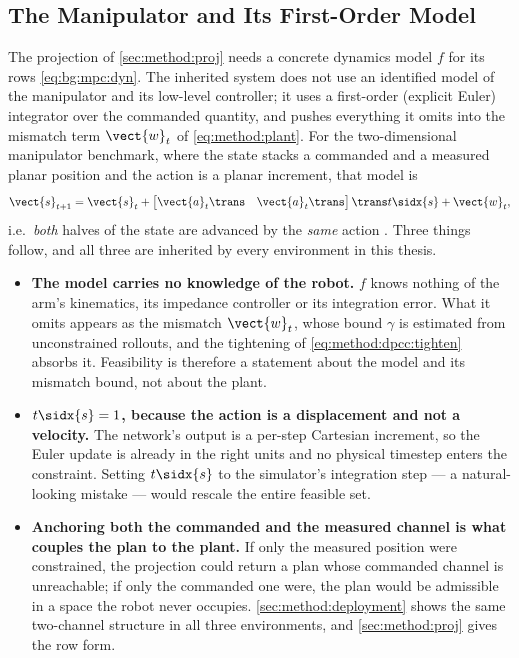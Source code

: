 \subsection{The Manipulator and Its First-Order Model}\label{sec:method:manipulator}

The projection of \autoref{sec:method:proj} needs a concrete dynamics model $f$ for its rows
\eqref{eq:bg:mpc:dyn}. The inherited system does not use an identified
model of the manipulator and its low-level controller; it uses a first-order (explicit Euler)
integrator over the commanded quantity, and pushes everything it omits into the mismatch term
$\vect{w}_{t}$ of \eqref{eq:method:plant}. For the two-dimensional manipulator benchmark, where the
state stacks a commanded and a measured planar position and the action is a planar increment, that
model is
\begin{equation}\label{eq:method:dpcc:euler}
  \vect{s}_{t+1}
  = \vect{s}_{t} + \begin{bmatrix}\vect{a}_{t}\trans & \vect{a}_{t}\trans\end{bmatrix}\trans t\sidx{s}
    + \vect{w}_{t},
\end{equation}
i.e.\ \emph{both} halves of the state are advanced by the \emph{same} action
\parencite[Sec.~6.1]{romer2025diffusion}. Three things follow, and all three are inherited by every
environment in this thesis.

\begin{itemize}
  \item \textbf{The model carries no knowledge of the robot.} $f$ knows nothing of the arm's
    kinematics, its impedance controller or its integration error. What it omits appears as the
    mismatch $\vect{w}_{t}$, whose bound $\gamma$ is estimated from unconstrained rollouts, and the
    tightening of \eqref{eq:method:dpcc:tighten} absorbs it. Feasibility is therefore a statement
    about the model and its mismatch bound, not about the plant.
  \item \textbf{$t\sidx{s} = 1$, because the action is a displacement and not a velocity.} The
    network's output is a per-step Cartesian increment, so the Euler update is already in the right
    units and no physical timestep enters the constraint. Setting $t\sidx{s}$ to the simulator's
    integration step --- a natural-looking mistake --- would rescale the entire feasible set.
  \item \textbf{Anchoring both the commanded and the measured channel is what couples the plan to
    the plant.} If only the measured position were constrained, the projection could return a plan
    whose commanded channel is unreachable; if only the commanded one were, the plan would be
    admissible in a space the robot never occupies. \autoref{sec:method:deployment} shows the same
    two-channel structure in all three environments, and \autoref{sec:method:proj} gives the row form.
\end{itemize}


